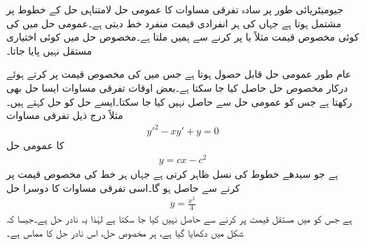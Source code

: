 جیومیٹریائی طور پر سادہ تفرقی مساوات کا عمومی حل لامتناہی حل کے خطوط پر مشتمل ہوتا ہے جہاں  کی ہر انفرادی قیمت منفرد خط دیتی ہے۔عمومی حل میں  کی کوئی مخصوص قیمت مثلاً  یا  پر کرنے سے ہمیں  ملتا ہے۔مخصوص حل میں کوئی اختیاری مستقل نہیں پایا جاتا۔

عام طور عمومی حل قابل حصول ہوتا ہے جس میں  کی مخصوص قیمت پر کرتے ہوئے درکار مخصوص حل حاصل کیا جا سکتا ہے۔بعض اوقات تفرقی مساوات ایسا حل بھی رکھتا ہے جس کو عمومی حل سے حاصل نہیں کیا جا سکتا۔ایسے حل کو  حل کہتے ہیں۔مثلاً درج ذیل تفرقی مساوات
\begin{align}\label{مساوات_ایک_درجی_نادر_مخصوص}
y'^2-xy'+y=0
\end{align}
کا عمومی حل
\begin{align*}
y=cx-c^2
\end{align*}
ہے جو سیدھے خطوط کی نسل ظاہر کرتی ہے جہاں ہر خط  کی مخصوص قیمت  پر کرنے سے حاصل ہو گا۔اسی تفرقی مساوات کا دوسرا حل
\begin{align*}
y=\frac{x^2}{4}
\end{align*}
ہے جس کو  میں مستقل قیمت پر کرنے سے حاصل نہیں کیا جا سکتا ہے لہٰذا یہ نادر حل ہے۔جیسا کہ شکل  میں دکھایا گیا ہے، ہر مخصوص حل، اس نادر حل کا مماس ہے۔

